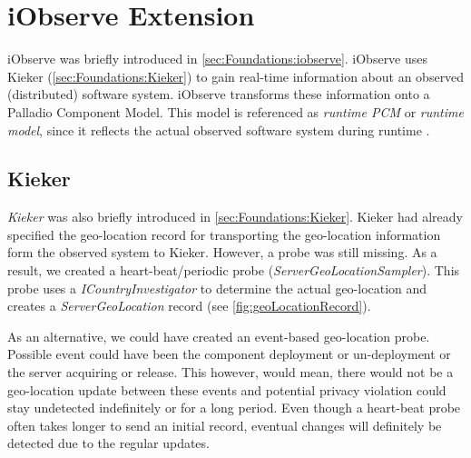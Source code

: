 
\chapter{iObserve Extension}
\label{ch:iObserve}

iObserve was briefly introduced in \autoref{sec:Foundations:iobserve}. iObserve uses Kieker (\autoref{sec:Foundations:Kieker}) to gain real-time information about an observed (distributed) software system. iObserve transforms these information onto a Palladio Component Model. This model is referenced as \textit{runtime PCM} or \textit{runtime model}, since it reflects the actual observed software system during runtime \cite{Heinrich.2016}.


\section{Kieker}
\label{sec:Kieker:privacy}

\textit{Kieker} was also briefly introduced in \autoref{sec:Foundations:Kieker}. Kieker had already specified the geo-location record for transporting the geo-location information form the observed system to Kieker. However, a probe was still missing. As a result, we created a heart-beat/periodic probe (\textit{ServerGeoLocationSampler}). This probe uses a \textit{ICountryInvestigator} to determine the actual geo-location and creates a \textit{ServerGeoLocation} record (see \autoref{fig:geoLocationRecord}).

As an alternative, we could have created an event-based geo-location probe. Possible event could have been the component deployment or un-deployment or the server acquiring or release. This however, would mean, there would not be a geo-location update between these events and potential privacy violation could stay undetected indefinitely or for a long period. Even though a heart-beat probe often takes longer to send an initial record, eventual changes will definitely be detected due to the regular updates.

